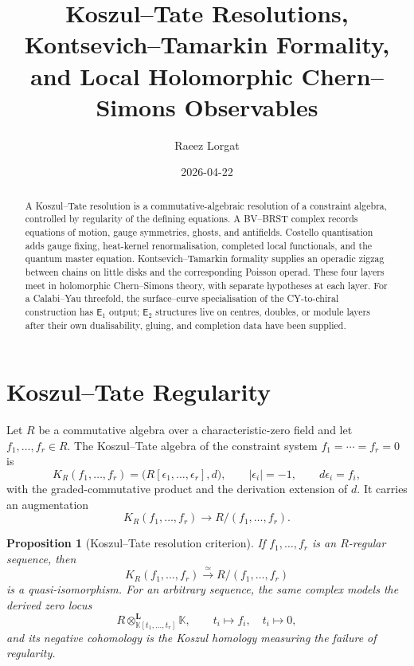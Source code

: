 \documentclass[11pt]{amsart}
\title[Koszul--Tate and Kontsevich--Tamarkin Formality]{Koszul--Tate Resolutions, Kontsevich--Tamarkin Formality, and Local Holomorphic Chern--Simons Observables}
\author{Raeez Lorgat}
\date{2026-04-22}
\newtheorem{proposition}[theorem]{Proposition}
\theoremstyle{definition}
\theoremstyle{remark}
\providecommand{\Etwo}{\mathsf{E}_2}
\providecommand{\Eone}{\mathsf{E}_1}
\begin{document}
\begin{abstract}
A Koszul--Tate resolution is a commutative-algebraic resolution of a
constraint algebra, controlled by regularity of the defining equations.
A BV--BRST complex records equations of motion, gauge symmetries, ghosts,
and antifields. Costello quantisation adds gauge fixing, heat-kernel
renormalisation, completed local functionals, and the quantum master
equation. Kontsevich--Tamarkin formality supplies an operadic zigzag
between chains on little disks and the corresponding Poisson operad.
These four layers meet in holomorphic Chern--Simons theory, with separate
hypotheses at each layer. For a Calabi--Yau threefold, the
surface--curve specialisation of the CY-to-chiral construction has
$\Eone$ output; $\Etwo$ structures live on centres, doubles, or module
layers after their own dualisability, gluing, and completion data have
been supplied.
\end{abstract}

\maketitle

\section{Koszul--Tate Regularity}
\label{sec:koszul-tate-regularity}

Let $R$ be a commutative algebra over a characteristic-zero field and
let $f_1,\ldots,f_r\in R$. The Koszul--Tate algebra of the constraint
system $f_1=\cdots=f_r=0$ is
\[
K_R(f_1,\ldots,f_r)
=
\bigl(R[\epsilon_1,\ldots,\epsilon_r],d\bigr),
\qquad
|\epsilon_i|=-1,\qquad d\epsilon_i=f_i,
\]
with the graded-commutative product and the derivation extension of $d$.
It carries an augmentation
\[
K_R(f_1,\ldots,f_r)\longrightarrow R/(f_1,\ldots,f_r).
\]

\begin{proposition}[Koszul--Tate resolution criterion]
\label{prop:kt-regularity}
If $f_1,\ldots,f_r$ is an $R$-regular sequence, then
\[
K_R(f_1,\ldots,f_r)\xrightarrow{\simeq}R/(f_1,\ldots,f_r)
\]
is a quasi-isomorphism. For an arbitrary sequence, the same complex
models the derived zero locus
\[
R\otimes^{\mathbf L}_{\mathbb K[t_1,\ldots,t_r]}\mathbb K,
\qquad
t_i\mapsto f_i,\quad t_i\mapsto 0,
\]
and its negative cohomology is the Koszul homology measuring the failure
of regularity.
\end{proposition}
\end{document}

